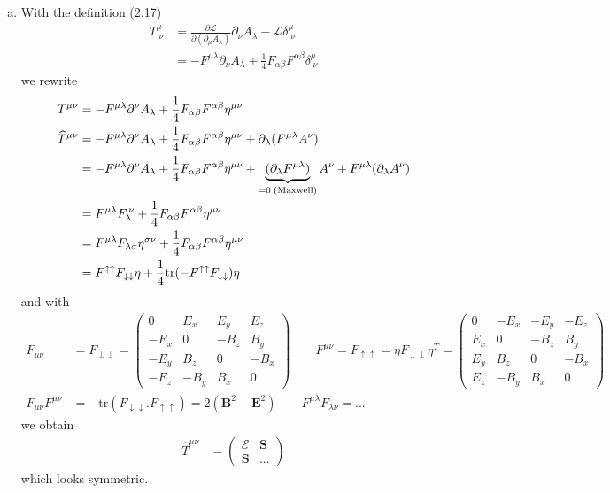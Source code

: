 \documentclass[../main.tex]{subfiles}
\begin{document}
\begin{enumerate}[(a)]
\item With the definition (2.17)
\begin{align}
T^\mu_{\;\nu}&=\frac{\partial\mathcal{L}}{\partial(\partial_\mu A_\lambda)}\partial_\nu A_\lambda-\mathcal{L}\delta^\mu_{\;\nu}\\
&=-F^{\mu\lambda}\partial_\nu A_\lambda+\frac{1}{4}F_{\alpha\beta}F^{\alpha\beta}\delta^\mu_{\;\nu}
\end{align}
we rewrite
\begin{align}
T^{\mu\nu}
&=-F^{\mu\lambda}\partial^\nu A_\lambda+\frac{1}{4}F_{\alpha\beta}F^{\alpha\beta}\eta^{\mu\nu}\\
\widehat{T}^{\mu\nu}
&=-F^{\mu\lambda}\partial^\nu A_\lambda+\frac{1}{4}F_{\alpha\beta}F^{\alpha\beta}\eta^{\mu\nu}+
\partial_\lambda(F^{\mu\lambda}A^\nu)\\
&=-F^{\mu\lambda}\partial^\nu A_\lambda+\frac{1}{4}F_{\alpha\beta}F^{\alpha\beta}\eta^{\mu\nu}+
\underbrace{(\partial_\lambda F^{\mu\lambda})}_{=0\text{\;(Maxwell)}}A^\nu+F^{\mu\lambda}(\partial_\lambda A^\nu)\\
&=F^{\mu\lambda}F_\lambda^{\,\nu}+\frac{1}{4}F_{\alpha\beta}F^{\alpha\beta}\eta^{\mu\nu}\\
&=F^{\mu\lambda}F_{\lambda\sigma}\eta^{\sigma\nu}+\frac{1}{4}F_{\alpha\beta}F^{\alpha\beta}\eta^{\mu\nu}\\
&=F^{\uparrow\uparrow}F_{\downarrow\downarrow}\eta+\frac{1}{4}\text{tr}(-F^{\uparrow\uparrow}F_{\downarrow\downarrow})\eta
\end{align}
and with
\begin{align}
F_{\mu\nu}&=F_{\downarrow\downarrow}=\begin{pmatrix}
0    &  E_x & E_y  & E_z\\
-E_x &  0   & -B_z & B_y\\
-E_y &  B_z & 0    & -B_x\\
-E_z & -B_y & B_x  & 0
\end{pmatrix}
\qquad
F^{\mu\nu}=F_{\uparrow\uparrow}=\eta F_{\downarrow\downarrow}\eta^T=\begin{pmatrix}
0    &  -E_x & -E_y  & -E_z\\
E_x &  0   & -B_z & B_y\\
E_y &  B_z & 0    & -B_x\\
E_z & -B_y & B_x  & 0
\end{pmatrix}\\
F_{\mu\nu}F^{\mu\nu}&=-\text{tr}(F_{\downarrow\downarrow}.F_{\uparrow\uparrow})=2(\mathbf{B}^2-\mathbf{E}^2)
\qquad
F^{\mu\lambda}F_{\lambda\nu}=...
\end{align}
we obtain
\begin{align}
\widehat{T}^{\mu\nu}
&=\begin{pmatrix}
\mathcal{E} & \mathbf{S} \\
\mathbf{S}  & ...
\end{pmatrix}
\end{align}
which looks symmetric.
\end{enumerate}
\end{document}

